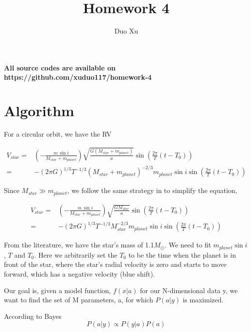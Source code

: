 \documentclass[12pt]{article}
\begin{document}
\title{Homework 4}
\author{Duo Xu}

{\bf All source codes are available on https://github.com/xuduo117/homework-4}



\section{Algorithm }
\label{Algorithm}

For a circular orbit, we have the RV

\begin{equation}
\left.\begin{aligned}
V_{star}=&(-\frac{m\, {\sin i}}{M_{star}+m_{planet}})\sqrt{\frac{G(M_{star}+m_{planet})}{a}} \sin (\frac{2\pi}{T}(t-T_{0})) \\
=&-(2\pi G)^{1/3}T^{-1/3}(M_{star}+m_{planet})^{-2/3}m_{planet}\sin i \sin (\frac{2\pi}{T}(t-T_{0}))
\end{aligned}\right.
\label{eq.part_1-1}
\end{equation}

Since $M_{star}\gg m_{planet}$, we follow the same strategy in \citet{2000ApJ...532L..55M} to simplify the equation, 

\begin{equation}
\left.\begin{aligned}
V_{star}=&(-\frac{m\, {\sin i}}{M_{star}+m_{planet}})\sqrt{\frac{GM_{star}}{a}} \sin (\frac{2\pi}{T}(t-T_{0}))\\
=&-(2\pi G)^{1/3}T^{-1/3}M_{star}^{-2/3}m_{planet}\sin i \sin (\frac{2\pi}{T}(t-T_{0}))
\end{aligned}\right.
\label{eq.part_1-2}
\end{equation}

From the literature, we have the star's mass of 1.1$M_{\odot}$. We need to fit $m_{planet}\sin i$, $T$ and $T_{0}$. Here we arbitrarily set the $T_{0}$ to be the time when the planet is in front of the star, where the star's radial velocity is zero and starts to move forward, which has a negative velocity (blue shift). 


Our goal is, given a model function, $f(x|a)$ for our N-dimensional data y, we want to find the set of M parameters, a, for which $P(a|y)$ is maximized.

According to Bayes
\begin{equation}
P(a|y)\propto P (y|a)P(a)
\end{equation}
\end{document}
